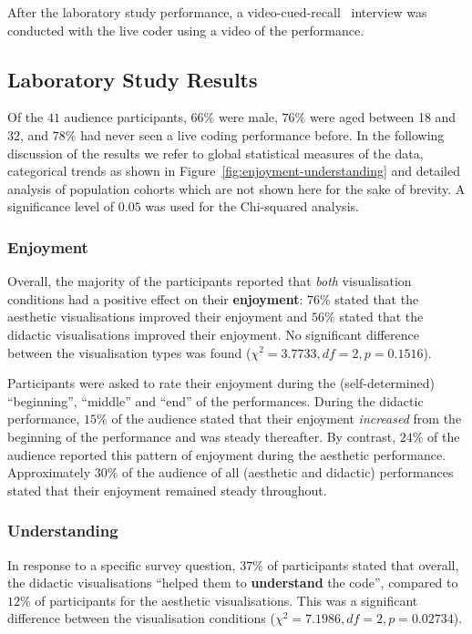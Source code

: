 \documentclass{sig-alternate}
\begin{document}
After the laboratory study performance, a
video-cued-recall~\cite{Suchman:1992tk} interview was conducted with
the live coder using a video of the performance.

\subsection{Laboratory Study Results}

Of the $41$ audience participants, $66\%$ were male, $76\%$ were aged
between 18 and 32, and $78\%$ had never seen a live coding performance
before. In the following discussion of the results we refer to global
statistical measures of the data, categorical trends as shown in
Figure~\ref{fig:enjoyment-understanding} and detailed analysis of
population cohorts which are not shown here for the sake of brevity. A
significance level of $0.05$ was used for the Chi-squared analysis.

\subsubsection{Enjoyment}

Overall, the majority of the participants reported that \emph{both}
visualisation conditions had a positive effect on their
\textbf{enjoyment}: $76\%$ stated that the aesthetic visualisations
improved their enjoyment and $56\%$ stated that the didactic
visualisations improved their enjoyment. No significant difference
between the visualisation types  was found
($\chi^2=3.7733,df=2,p=0.1516$).

Participants were asked to rate their enjoyment during the
(self-determined) ``beginning'', ``middle'' and ``end'' of the
performances. During the didactic performance, $15\%$ of the audience
stated that their enjoyment \emph{increased} from the beginning of the
performance and was steady thereafter. By contrast, $24\%$ of the
audience reported this pattern of enjoyment during the aesthetic
performance. Approximately $30\%$ of the audience of all (aesthetic
and didactic) performances stated that their enjoyment remained steady
throughout.

\subsubsection{Understanding}

In response to a specific survey question, $37\%$ of participants
stated that overall, the didactic visualisations ``helped them to
\textbf{understand} the code'', compared to $12\%$ of participants for
the aesthetic visualisations. This was a significant difference
between the visualisation conditions ($\chi^2=7.1986,df=2,p=0.02734$).
\end{document}
